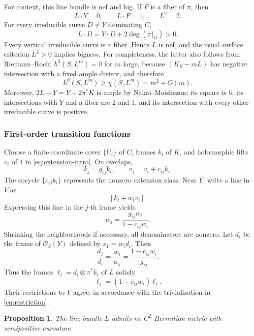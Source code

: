 \documentclass[11pt]{amsart}
\newtheorem{proposition}[theorem]{Proposition}
\theoremstyle{definition}
\theoremstyle{remark}
\numberwithin{equation}{section}
\newcommand{\OO}{\mathcal O}
\begin{document}
For context, this line bundle is nef and big. If $F$ is a fiber of $\pi$,
then
\[
 L\cdot Y=0,\qquad L\cdot F=1,\qquad L^2=2.
\]
For every irreducible curve $D\ne Y$ dominating $C$,
\[
 L\cdot D=Y\cdot D+2\deg(\pi|_D)>0.
\]
Every vertical irreducible curve is a fiber. Hence $L$ is nef, and the
usual surface criterion $L^2>0$ implies bigness. For completeness, the
latter also follows from Riemann--Roch: $h^2(S,L^m)=0$ for $m$ large,
because $(K_S-mL)$ has negative intersection with a fixed ample divisor,
and therefore
\[
 h^0(S,L^m)\ge\chi(S,L^m)=m^2+O(m).
\]
Moreover, $2L-Y=Y+2\pi^*K$ is ample by Nakai--Moishezon: its square is
$6$, its intersections with $Y$ and a fiber are $2$ and $1$, and its
intersection with every other irreducible curve is positive.

\subsubsection{First-order transition functions}

Choose a finite coordinate cover $\{U_i\}$ of $C$, frames $k_i$ of $K$,
and holomorphic lifts $v_i$ of $1$ in \eqref{eq:extension-intro}.
On overlaps,
\begin{equation}\label{eq:vector-transitions}
 k_j=g_{ij}k_i,\qquad v_j=v_i+c_{ij}k_i.
\end{equation}
The cocycle $\{c_{ij}k_i\}$ represents the nonzero extension class.
Near $Y$, write a line in $V$ as
\[
 [k_i+w_iv_i].
\]
Expressing this line in the $j$-th frame yields
\begin{equation}\label{eq:normal-transition}
 w_j=\frac{g_{ij}w_i}{1-c_{ij}w_i}.
\end{equation}
Shrinking the neighborhoods if necessary, all denominators are nonzero.
Let $d_i$ be the frame of $\OO_S(Y)$ defined by $s_Y=w_id_i$. Then
\[
 \frac{d_j}{d_i}=\frac{w_i}{w_j}
 =\frac{1-c_{ij}w_i}{g_{ij}}.
\]
Thus the frames $\ell_i=d_i\otimes\pi^*k_i$ of $L$ satisfy
\begin{equation}\label{eq:L-transition}
 \ell_j=(1-c_{ij}w_i)\ell_i.
\end{equation}
Their restrictions to $Y$ agree, in accordance with the trivialization
in \eqref{eq:restriction}.

\begin{proposition}\label{prop:no-metric}
The line bundle $L$ admits no $C^2$ Hermitian metric with semipositive
curvature.
\end{proposition}
\end{document}
